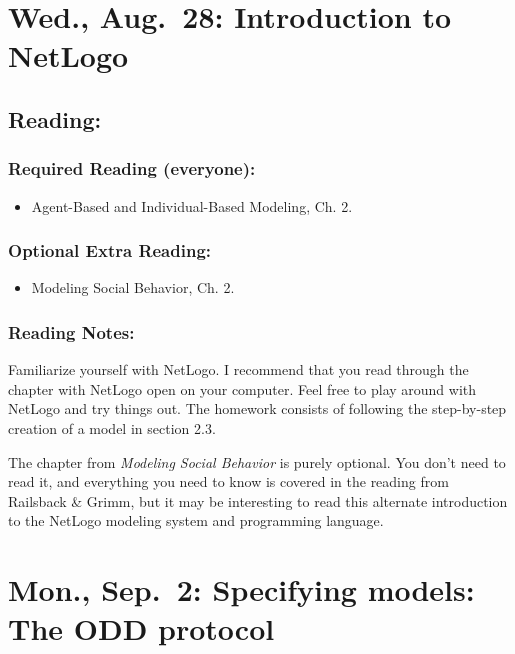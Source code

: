 \documentclass[
]{article}
\providecommand{\tightlist}{%
  \setlength{\itemsep}{0pt}\setlength{\parskip}{0pt}}
\begin{document}
\section{Wed., Aug.~28: Introduction to
NetLogo}\label{wed.-aug.-28-introduction-to-netlogo}

\subsection{Reading:}\label{reading-2}

\subsubsection{Required Reading
(everyone):}\label{required-reading-everyone-1}

\begin{itemize}
\tightlist
\item
  Agent-Based and Individual-Based Modeling, Ch. 2.
\end{itemize}

\subsubsection{Optional Extra Reading:}\label{optional-extra-reading-1}

\begin{itemize}
\tightlist
\item
  Modeling Social Behavior, Ch. 2.
\end{itemize}

\subsubsection{Reading Notes:}\label{reading-notes-1}

Familiarize yourself with NetLogo. I recommend that you read through the
chapter with NetLogo open on your computer. Feel free to play around
with NetLogo and try things out. The homework consists of following the
step-by-step creation of a model in section 2.3.

The chapter from \emph{Modeling Social Behavior} is purely optional. You
don't need to read it, and everything you need to know is covered in the
reading from Railsback \& Grimm, but it may be interesting to read this
alternate introduction to the NetLogo modeling system and programming
language.

\section{Mon., Sep.~2: Specifying models: The ODD
protocol}\label{mon.-sep.-2-specifying-models-the-odd-protocol}
\end{document}
